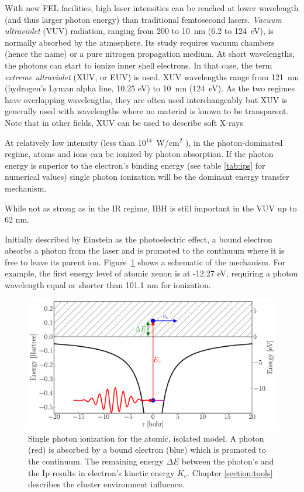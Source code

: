 With new FEL facilities, high laser intensities can be reached at
lower wavelength (and thus larger photon energy) than traditional
femtosecond lasers. \textit{Vacuum ultraviolet} (VUV) radiation, ranging from 200 to
10~nm (6.2 to 124~eV), is normally absorbed by the atmosphere. Its study
requires vacuum chambers (hence the name) or a pure nitrogen propagation medium.
At short wavelengths, the photons can start to ionize inner shell electrons. In
that case, the term \textit{extreme ultraviolet} (XUV, or EUV) is used. XUV wavelengths
range from 121~nm (hydrogen's Lyman alpha line, 10.25 eV) to 10~nm (124~eV).
As the two regimes have overlapping wavelengths, they are often used
interchangeably but XUV is generally used with wavelengths where no
material is known to be transparent\cite{Laane2009}. Note that in other fields,
XUV can be used to describe soft X-rays\cite{Eichmeier2008,iso21348}

At relatively low intensity (less than 10$^{14}$~W/cm$^2$
\cite{Ramunno2008}), in the photon-dominated regime, atoms and ions
can be ionized by photon absorption. If the photon energy is superior to the
electron's binding energy (see table \ref{tab:ips} for numerical values) single
photon ionization will be the dominant energy transfer mechanism.

While not as strong as in the IR regime, IBH is still important in the
VUV\cite{Krainov2000} up to 62 nm\cite{Georgescu2007}.



Initially described by Einstein as the photoelectric effect, a bound electron
absorbs a photon from the laser and is promoted to the continuum where it is
free to leave its parent ion. Figure~\ref{fig:ionization:single} shows a
schematic of the mechanism. For example, the first energy level of atomic
xenon is at -12.27 eV, requiring a photon wavelength equal or shorter than
101.1 nm for ionization.


\begin{figure}
 \centering
 \includegraphics[width=\figurewidth]{figures/ionization_single}
 \caption{Single photon ionization for the atomic, isolated model. A photon
          (red) is absorbed by a bound electron (blue) which is promoted to
          the continuum. The remaining energy $\Delta E$ between the photon's
          and the Ip results in electron's kinetic energy $K_e$.
          Chapter \ref{section:tools} describes the cluster environment
          influence.}
 \label{fig:ionization:single}
\end{figure}

